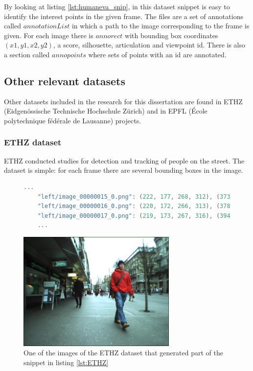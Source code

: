 By looking at listing \ref{lst:humaneva_snip}, in this dataset snippet is easy to identify the interest points in the given frame. The files are a set of annotations called $annotationList$ in which a path to the image corresponding to the frame is given. For each image there is $annorect$ with bounding box coordinates $(x1,y1,x2,y2)$, a score, silhouette, articulation and viewpoint id. There is also a section called $annopoints$ where sets of points with an id are annotated.

\subsection{Other relevant datasets}
Other datasets included in the research for this dissertation are found in ETHZ (Eidgenössische Technische Hochschule Zürich) and in EPFL (\'Ecole polytechnique f\'ed\'erale de Lausanne) projects. 
\subsubsection{ETHZ dataset}
ETHZ conducted studies for detection and tracking of people on the street. The dataset is simple: for each frame there are several bounding boxes in the image.
\begin{figure}
\begin{center}
	\begin{lstlisting}[label={lst:ETHZ}, caption={ETHZ dataset dataset file snippet.},language=c++]
	...
	"left/image_00000015_0.png": (222, 177, 268, 312), (373, 105, 463, 393), (458, 220, 487, 285), (310, 225, 327, 265), (335, 228, 352, 264), (267, 228, 281, 261);
	"left/image_00000016_0.png": (220, 172, 266, 313), (378, 407, 476, 102), (462, 219, 486, 285), (312, 223, 327, 264), (337, 226, 352, 262), (267, 231, 279, 260);
	"left/image_00000017_0.png": (219, 173, 267, 316), (394, 94, 489, 423), (313, 222, 330, 262), (338, 227, 354, 262), (267, 228, 279, 260);
	...	\end{lstlisting}
\end{center}
\end{figure}

\begin{figure}[htp]
	
	\centering
	\includegraphics[width=0.7\textwidth]{capstate/imgs/image_00000016_0.png}
	
	\caption{One of the images of the ETHZ dataset that generated part of the snippet in listing \ref{lst:ETHZ} }
	\label{fig:ETHZ}
	
\end{figure}

